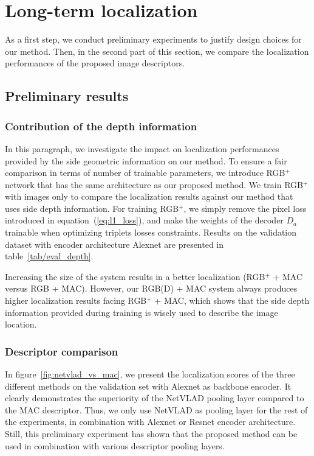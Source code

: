 \section{Long-term localization}
\label{sec:experiments}

As a first step, we conduct preliminary experiments to justify design choices for our method. Then, in the second part of this section, we compare the localization performances of the proposed image descriptors.

\subsection{Preliminary results}

\subsubsection{Contribution of the depth information}

In this paragraph, we investigate the impact on localization performances provided by the side geometric information on our method. To ensure a fair comparison in terms of number of trainable parameters, we introduce RGB$^+$ network that has the same architecture as our proposed method. We train RGB$^+$ with images only to compare the localization results against our method that uses side depth information. For training RGB$^+$, we simply remove the pixel loss introduced in equation~(\ref{eq:l1_loss}), and make the weights of the decoder $D_a$ trainable when optimizing triplets losses constraints. Results on the validation dataset with encoder architecture Alexnet are presented in table~\ref{tab/eval_depth}.

Increasing the size of the system results in a better localization (RGB$^{+}$ + MAC versus RGB + MAC). However, our RGB(D) + MAC system always produces higher localization results facing RGB$^{+}$ + MAC, which shows that the side depth information provided during training is wisely used to describe the image location.

\subsubsection{Descriptor comparison}

In figure~\ref{fig:netvlad_vs_mac}, we present the localization scores of the three different methods on the validation set with Alexnet as backbone encoder. It clearly demonstrates the superiority of the NetVLAD pooling layer compared to the MAC descriptor. Thus, we only use NetVLAD as pooling layer for the rest of the experiments, in combination with Alexnet or Resnet encoder architecture. Still, this preliminary experiment has shown that the proposed method can be used in combination with various descriptor pooling layers.


